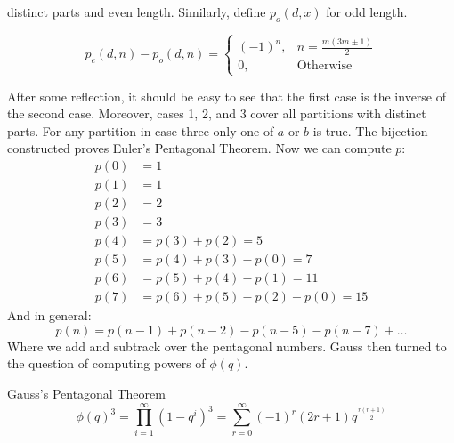 \documentclass[crop=false,class=book,oneside]{standalone}
\begin{document}
        distinct parts and even length. Similarly, define
        $p_{o}(d,x)$ for odd length.
        \begin{theorem}
            \begin{equation}
                p_{e}(d,n)-p_{o}(d,n)=
                \begin{cases}
                    (\minus{1})^{n},&n=\frac{m(3m\pm{1})}{2}\\
                    0,&\textrm{Otherwise}
                \end{cases}
            \end{equation}
        \end{theorem}
        After some reflection, it should be easy to see that
        the first case is the inverse of the second case. Moreover,
        cases 1, 2, and 3 cover all partitions with distinct
        parts. For any partition in case three only one of
        $a$ or $b$ is true. The bijection constructed proves
        Euler's Pentagonal Theorem. Now we can compute $p$:
        \begin{subequations}
            \begin{align}
                p(0)&=1\\
                p(1)&=1\\
                p(2)&=2\\
                p(3)&=3\\
                p(4)&=p(3)+p(2)=5\\
                p(5)&=p(4)+p(3)-p(0)=7\\
                p(6)&=p(5)+p(4)-p(1)=11\\
                p(7)&=p(6)+p(5)-p(2)-p(0)=15
            \end{align}
        \end{subequations}
        And in general:
        \begin{equation}
            p(n)=p(n-1)+p(n-2)-p(n-5)-p(n-7)+\dots
        \end{equation}
        Where we add and subtrack over the pentagonal numbers.
        Gauss then turned to the question of computing powers
        of $\phi(q)$.
        \begin{ltheorem}{Gauss's Pentagonal Theorem}
            \begin{equation}
                \phi(q)^{3}=\prod_{i=1}^{\infty}(1-q^{i})^{3}
                =\sum_{r=0}^{\infty}(\minus{1})^{r}(2r+1)
                    q^{\frac{r(r+1)}{2}}
            \end{equation}
        \end{ltheorem}
\end{document}
